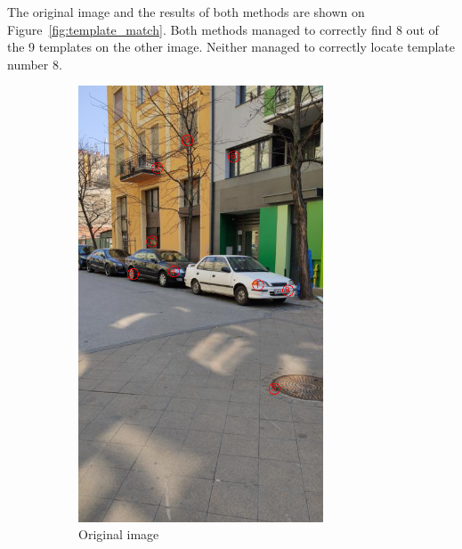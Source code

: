 The original image and the results of both methods are shown on Figure~\ref{fig:template_match}.
Both methods managed to correctly find 8 out of the 9 templates on the other image. Neither managed to correctly locate template number 8.
\begin{figure}[tbp]
    \centering
    \begin{subfigure}{0.68\textwidth}
        \centering
    \includegraphics[width=0.8\textwidth, trim=0 200 0 80, clip]{figures/templates/template.png}
	\caption{Original image}
    \end{subfigure}\\
    \begin{subfigure}{0.45\textwidth}
        \centering

\end{subfigure}
\end{figure}
